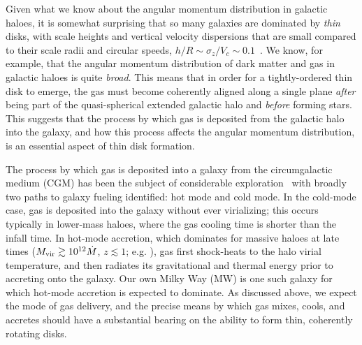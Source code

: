 \documentclass[fleqn,usenatbib]{mnras}
\newcommand{\Mdot}{\dot{M}}
\begin{document}
Given what we know about the angular momentum distribution in galactic haloes, it is somewhat surprising that so many galaxies are dominated by {\em thin} disks, with  scale heights and vertical velocity dispersions that are small compared to their scale radii and circular speeds, $h/R \sim \sigma_z/V_c \sim 0.1$~\citep[][]{Kregel2002}.
We know, for example, that the angular momentum distribution of dark matter \citep{Bullock2001,Lian2018} and gas \citep{Stewart2013,DeFelippis2020} in galactic haloes is quite \textit{broad}.
This means that in order for a tightly-ordered thin disk to emerge, the gas must become coherently aligned along a single plane \textit{after} being part of the quasi-spherical extended galactic halo and \textit{before} forming stars.
This suggests that the process by which gas is deposited from the galactic halo into the galaxy, and how this process affects the angular momentum distribution, is an essential aspect of thin disk formation.

The process by which gas is deposited into a galaxy from the circumgalactic medium (CGM) has been the subject of considerable exploration~\citep[e.g.][]{Keres2005, Keres2009a, Dekel2006, Faucher-Giguere2011a, VanDeVoort2011a, Angles-Alcazar2017, Martin2019a} with broadly two paths to galaxy fueling identified: hot mode and cold mode.
In the cold-mode case, gas is deposited into the galaxy without ever virializing; this occurs typically in lower-mass haloes, where the gas cooling time is shorter than the infall time.
In hot-mode accretion, which dominates for massive haloes at late times ($M_{\rm vir} \gtrsim 10^{12} \Mdot$, $z \lesssim 1$; e.g. \citealt{Faucher-Giguere2011a, VandeVoort2011, VandeVoort2012a, Joung2012, Murante2012, Nelson2013, Fielding2017}), gas first shock-heats to the halo virial temperature, and then radiates its gravitational and thermal energy prior to accreting onto the galaxy.
Our own Milky Way (MW) is one such galaxy for which hot-mode accretion is expected to dominate.
As discussed above, we expect the mode of gas delivery, and the precise means by which gas mixes, cools, and accretes should have a substantial bearing on the ability to form thin, coherently rotating disks.
\end{document}
